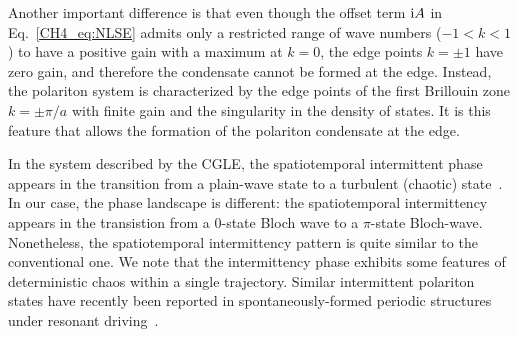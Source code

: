 Another important difference is that even though the offset term $\mathrm{i} A$ in Eq.~\eqref{CH4_eq:NLSE} admits only a restricted range of wave numbers ($-1<k<1$) to have a positive gain with a maximum at $k=0$, the edge points $k=\pm 1$ have zero gain, and therefore the condensate cannot be formed at the edge.
Instead, the polariton system is characterized by the edge points of the first Brillouin zone $k = \pm \pi/a$ with finite gain and the singularity in the density of states.
It is this feature that allows the formation of the polariton condensate at the edge.

In the system described by the CGLE, the spatiotemporal intermittent phase appears in the transition from a plain-wave state to a turbulent (chaotic) state~\cite{Chate:1994aa}.
In our case, the phase landscape is different: the spatiotemporal intermittency appears in the transistion from a $0$-state Bloch wave to a $\pi$-state Bloch-wave.
Nonetheless, the spatiotemporal intermittency pattern is quite similar to the conventional one.
We note that the intermittency phase exhibits some features of deterministic chaos within a single trajectory.
Similar intermittent polariton states have recently been reported in spontaneously-formed periodic structures under resonant driving~\cite{Gavrilov:2018aa}.

